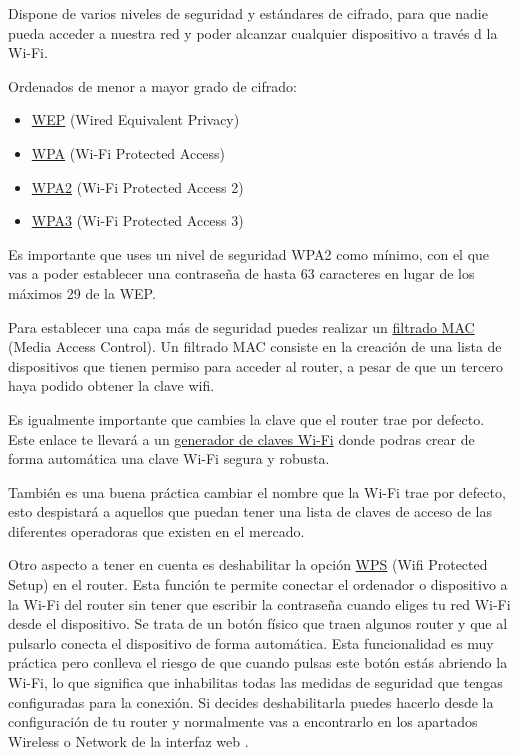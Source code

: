 \documentclass[
  spanish,
  a4paper,
  openany]{book}
\providecommand{\tightlist}{%
  \setlength{\itemsep}{0pt}\setlength{\parskip}{0pt}}
\begin{document}
Dispone de varios niveles de seguridad y estándares de cifrado, para que nadie pueda acceder a nuestra red y poder alcanzar cualquier dispositivo a través d la Wi-Fi.

Ordenados de menor a mayor grado de cifrado:

\begin{itemize}
\tightlist
\item
  \href{https://es.wikipedia.org/wiki/Wired_Equivalent_Privacy}{WEP} (Wired Equivalent Privacy)
\item
  \href{https://es.wikipedia.org/wiki/Wi-Fi_Protected_Access}{WPA} (Wi-Fi Protected Access)
\item
  \href{https://es.wikipedia.org/wiki/WPA2}{WPA2} (Wi-Fi Protected Access 2)
\item
  \href{https://es.wikipedia.org/wiki/WPA3}{WPA3} (Wi-Fi Protected Access 3)
\end{itemize}

Es importante que uses un nivel de seguridad WPA2 como mínimo, con el que vas a poder establecer una contraseña de hasta 63 caracteres en lugar de los máximos 29 de la WEP.

Para establecer una capa más de seguridad puedes realizar un \href{https://es.wikipedia.org/wiki/Filtrado_MAC}{filtrado MAC} (Media Access Control). Un filtrado MAC consiste en la creación de una lista de dispositivos que tienen permiso para acceder al router, a pesar de que un tercero haya podido obtener la clave wifi.

Es igualmente importante que cambies la clave que el router trae por defecto. Este enlace te llevará a un \href{https://bandaancha.eu/generador-claves-wifi}{generador de claves Wi-Fi} donde podras crear de forma automática una clave Wi-Fi segura y robusta.

También es una buena práctica cambiar el nombre que la Wi-Fi trae por defecto, esto despistará a aquellos que puedan tener una lista de claves de acceso de las diferentes operadoras que existen en el mercado.

Otro aspecto a tener en cuenta es deshabilitar la opción \href{https://es.wikipedia.org/wiki/Wi-Fi_Protected_Setup}{WPS} (Wifi Protected Setup) en el router. Esta función te permite conectar el ordenador o dispositivo a la Wi-Fi del router sin tener que escribir la contraseña cuando eliges tu red Wi-Fi desde el dispositivo. Se trata de un botón físico que traen algunos router y que al pulsarlo conecta el dispositivo de forma automática. Esta funcionalidad es muy práctica pero conlleva el riesgo de que cuando pulsas este botón estás abriendo la Wi-Fi, lo que significa que inhabilitas todas las medidas de seguridad que tengas configuradas para la conexión. Si decides deshabilitarla puedes hacerlo desde la configuración de tu router y normalmente vas a encontrarlo en los apartados Wireless o Network de la interfaz web \citep{XATAKA-wps}.
\end{document}
